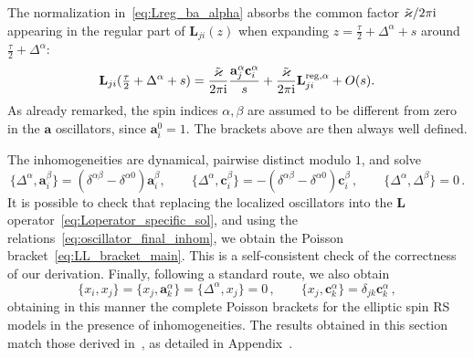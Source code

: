 The normalization in~\eqref{eq:Lreg_ba_alpha} absorbs the common factor
$\tilde{\varkappa}/2\pi\mathrm{i}$ appearing in the regular part of $\mathbf{L}_{ji}(z)$ when expanding $z = \tfrac{\tau}{2}+\Delta^\alpha+s$ around $\tfrac{\tau}{2}+\Delta^\alpha$: 
\begin{equation}
\mathbf{L}_{ji}(\tfrac{\tau}{2}+\Delta^\alpha+s)=\frac{\tilde{\varkappa}}{2\pi \mathrm{i} }
\frac{\mathbf{a}_j^\alpha\mathbf{c}_i^\alpha}{s}
+
\frac{\tilde{\varkappa}}{2\pi\mathrm{i}}
\mathbf{L}^{\mathrm{reg},\alpha}_{ji}+O(s).
\end{equation}
As already remarked, the spin indices $\alpha, \beta$ are assumed to be different from zero in the $\mathbf{a}$ oscillators, since $\mathbf{a}_i^0=1$. The brackets above are then always well defined.

The inhomogeneities are dynamical, pairwise distinct modulo $1$,
and solve
\begin{equation}
\label{eq:Delta_a_b_br}
   \{ \Delta^\alpha, \mathbf{a}_i^\beta \} = (\delta^{\alpha\beta}-\delta^{\alpha0}) \mathbf{a}_i^\beta, \qquad \{ \Delta^\alpha, \mathbf{c}_i^\beta \} = -(\delta^{\alpha\beta}-\delta^{\alpha0}) \mathbf{c}_i^\beta \,, \qquad \{ \Delta^\alpha, \Delta^\beta \}=0 \,.
\end{equation}
It is possible to check that replacing the localized oscillators into the $\mathbf{L}$ operator~\eqref{eq:Loperator_specific_sol}, and using the relations~\eqref{eq:oscillator_final_inhom}, we obtain the Poisson bracket~\eqref{eq:LL_bracket_main}. This is a self-consistent check of the correctness of our derivation.
Finally, following a standard route, we also obtain
\begin{equation}
\label{eq:bq_br}
\{x_i, x_j \} = \{x_j, \mathbf{a}_k^\alpha \} =\{\Delta^\alpha, x_j \} =0 \,, \qquad \{x_j, \mathbf{c}_k^\alpha \} =\delta_{jk} \mathbf{c}_k^\alpha \,,
\end{equation}
obtaining in this manner the complete Poisson brackets for the elliptic spin RS models in the presence of inhomogeneities. The results obtained in this section match those derived in~\cite{arutyunov_elliptic_2026}, as detailed in Appendix~.

